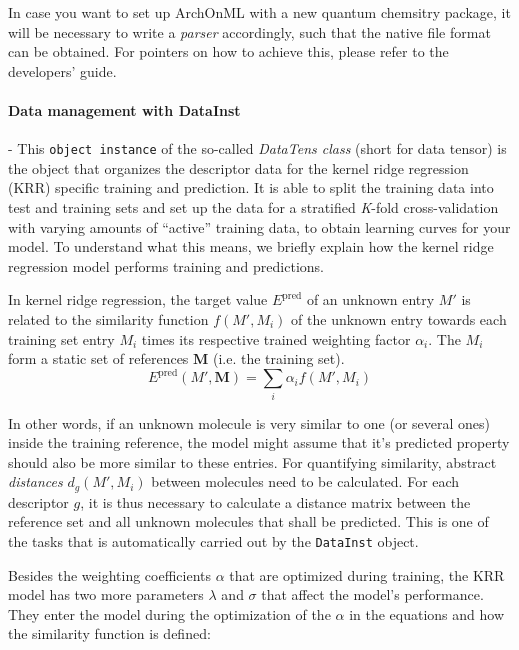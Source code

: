\documentclass[12pt]{achemso}
\begin{document}
\noindent In case you want to set up ArchOnML with a new quantum chemsitry package, it will be necessary to write a \textit{parser} accordingly, such that the native file format can be obtained. For pointers on how to achieve this, please refer to the developers' guide.

\paragraph{Data management with DataInst} - This \texttt{object instance} of the so-called \textit{DataTens class} (short for data tensor) is the object that organizes the descriptor data for the kernel ridge regression (KRR) specific training and prediction. It is able to split the training data into test and training sets and set up the data for a stratified \textit{K}-fold cross-validation with varying amounts of ``active'' training data, to obtain learning curves for your model. To understand what this means, we briefly explain how the kernel ridge regression model performs training and predictions.

\noindent In kernel ridge regression, the target value $E^\mathrm{pred}$ of an unknown entry $M'$ is related to the similarity function $f(M', M_i)$ of the unknown entry towards each training set entry $M_i$ times its respective trained weighting factor $\alpha_i$. The $M_i$ form a static set of references $\mathbf{M}$ (i.e. the training set).\\[-3em]

\begin{equation}
    E^\mathrm{pred}(M', \mathbf{M}) = \sum\limits_{i} \alpha_i f(M', M_i)
\end{equation}

\noindent In other words, if an unknown molecule is very similar to one (or several ones) inside the training reference, the model might assume that it's predicted property should also be more similar to these entries. For quantifying similarity, abstract \textit{distances} $d_g (M', M_i)$ between molecules need to be calculated. For each descriptor $g$, it is thus necessary to calculate a distance matrix between the reference set and all unknown molecules that shall be predicted. This is one of the tasks that is automatically carried out by the \texttt{DataInst} object.

\noindent Besides the weighting coefficients $\alpha$ that are optimized during training, the KRR model has two more parameters $\lambda$ and $\sigma$ that affect the model's performance. They enter the model during the optimization of the $\alpha$ in the equations and how the similarity function is defined:
\end{document}
